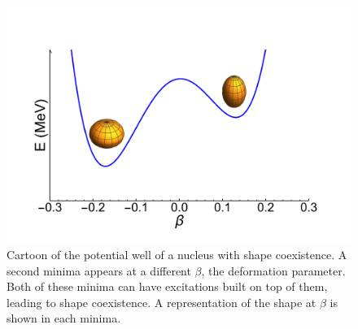 \begin{figure}[t]
    \centering
    \includegraphics[scale=0.7]{Introduction_Figs/ShapeCoexist.pdf}
    \caption{Cartoon of the potential well of a nucleus with shape coexistence. A second minima appears at a different $\beta$, the deformation parameter. Both of these minima can have excitations built on top of them, leading to shape coexistence. A representation of the shape at $\beta$ is shown in each minima.}
    \label{fig:shape}
\end{figure}